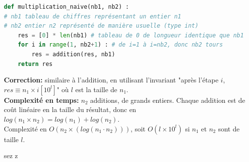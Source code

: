 \documentclass{article}
\begin{document}
\begin{lstlisting}[language=Python]
def multiplication_naive(nb1, nb2) :
# nb1 tableau de chiffres représentant un entier n1
# nb2 entier n2 représenté de manière usuelle (type int)
    res = [0] * len(nb1) # tableau de 0 de longueur identique que nb1
    for i in range(1, nb2+1) : # de i=1 à i=nb2, donc nb2 tours
        res = addition(res, nb1)
    return res
\end{lstlisting}

\textbf{Correction:} similaire à l'addition, en utilisant l'invariant "après l'étape $i$, $res \equiv n_1 \times i [10^l]$" où $l$ est la taille de $n_1$.\\
\textbf{Complexité en temps:} $n_2$ additions, de grands entiers. Chaque addition est de coût linéaire en la taille du résultat, donc en $log(n_1 \times n_2) = log(n_1) + log(n_2)$.\\
Complexité en $O(n_2 \times (log(n_1 \cdot n_2)))$, soit $O(l \times 10^l)$ si $n_1$ et $n_2$ sont de taille $l$.

sez z
\end{document}

